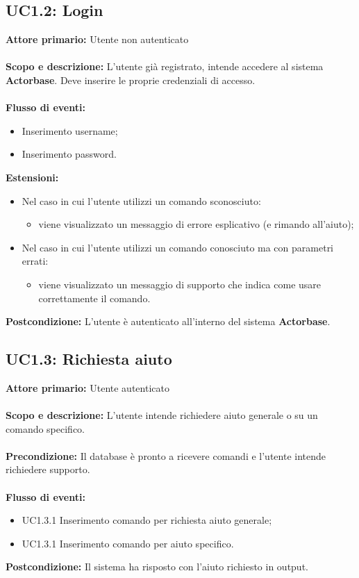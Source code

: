 \documentclass{scalatekids-article}
\begin{document}
\subsection{UC1.2: Login}
\textbf{Attore primario:} Utente non autenticato\\ \\
\textbf{Scopo e descrizione:} L’utente già registrato, intende accedere al sistema \textbf{Actorbase}. Deve inserire le proprie credenziali di accesso. \\ \\
\textbf{Flusso di eventi:}
\begin{itemize}
\item Inserimento username;
\item Inserimento password.
\end{itemize}
\textbf{Estensioni:}
\begin{itemize}
\item Nel caso in cui l'utente utilizzi un comando sconosciuto:
  \begin{itemize}
  \item viene visualizzato un messaggio di errore esplicativo (e rimando all'aiuto);
  \end{itemize}
\item Nel caso in cui l'utente utilizzi un comando conosciuto ma con parametri errati:
  \begin{itemize}
  \item viene visualizzato un messaggio di supporto che indica come usare correttamente il comando.
  \end{itemize}
\end{itemize}
\textbf{Postcondizione:} L'utente è autenticato all'interno del sistema \textbf{Actorbase}.
\subsection{UC1.3: Richiesta aiuto}
\textbf{Attore primario:} Utente autenticato\\ \\
\textbf{Scopo e descrizione:} L'utente intende richiedere aiuto generale o su un comando specifico.\\ \\
\textbf{Precondizione:} Il database è pronto a ricevere comandi e l'utente intende richiedere supporto.\\ \\
\textbf{Flusso di eventi:}
\begin{itemize}
\item UC1.3.1 Inserimento comando per richiesta aiuto generale;
\item UC1.3.1 Inserimento comando per aiuto specifico.
\end{itemize}
\textbf{Postcondizione:} Il sistema ha risposto con l'aiuto richiesto in output.
\end{document}
